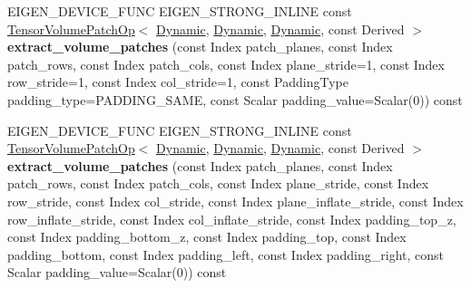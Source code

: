 \begin{DoxyCompactItemize}
\item 
\mbox{\label{class_eigen_1_1_tensor_base_3_01_derived_00_01_read_only_accessors_01_4_aceda047f96044dce3dcc7fb53b0337bc}} 
E\+I\+G\+E\+N\+\_\+\+D\+E\+V\+I\+C\+E\+\_\+\+F\+U\+NC E\+I\+G\+E\+N\+\_\+\+S\+T\+R\+O\+N\+G\+\_\+\+I\+N\+L\+I\+NE const \hyperlink{class_eigen_1_1_tensor_volume_patch_op}{Tensor\+Volume\+Patch\+Op}$<$ \hyperlink{namespace_eigen_ad81fa7195215a0ce30017dfac309f0b2}{Dynamic}, \hyperlink{namespace_eigen_ad81fa7195215a0ce30017dfac309f0b2}{Dynamic}, \hyperlink{namespace_eigen_ad81fa7195215a0ce30017dfac309f0b2}{Dynamic}, const Derived $>$ {\bfseries extract\+\_\+volume\+\_\+patches} (const Index patch\+\_\+planes, const Index patch\+\_\+rows, const Index patch\+\_\+cols, const Index plane\+\_\+stride=1, const Index row\+\_\+stride=1, const Index col\+\_\+stride=1, const Padding\+Type padding\+\_\+type=P\+A\+D\+D\+I\+N\+G\+\_\+\+S\+A\+ME, const Scalar padding\+\_\+value=Scalar(0)) const
\item 
\mbox{\label{class_eigen_1_1_tensor_base_3_01_derived_00_01_read_only_accessors_01_4_ae469b6926bcfc01f46f57f83ce1da1f7}} 
E\+I\+G\+E\+N\+\_\+\+D\+E\+V\+I\+C\+E\+\_\+\+F\+U\+NC E\+I\+G\+E\+N\+\_\+\+S\+T\+R\+O\+N\+G\+\_\+\+I\+N\+L\+I\+NE const \hyperlink{class_eigen_1_1_tensor_volume_patch_op}{Tensor\+Volume\+Patch\+Op}$<$ \hyperlink{namespace_eigen_ad81fa7195215a0ce30017dfac309f0b2}{Dynamic}, \hyperlink{namespace_eigen_ad81fa7195215a0ce30017dfac309f0b2}{Dynamic}, \hyperlink{namespace_eigen_ad81fa7195215a0ce30017dfac309f0b2}{Dynamic}, const Derived $>$ {\bfseries extract\+\_\+volume\+\_\+patches} (const Index patch\+\_\+planes, const Index patch\+\_\+rows, const Index patch\+\_\+cols, const Index plane\+\_\+stride, const Index row\+\_\+stride, const Index col\+\_\+stride, const Index plane\+\_\+inflate\+\_\+stride, const Index row\+\_\+inflate\+\_\+stride, const Index col\+\_\+inflate\+\_\+stride, const Index padding\+\_\+top\+\_\+z, const Index padding\+\_\+bottom\+\_\+z, const Index padding\+\_\+top, const Index padding\+\_\+bottom, const Index padding\+\_\+left, const Index padding\+\_\+right, const Scalar padding\+\_\+value=Scalar(0)) const
\item 
\mbox{\label{class_eigen_1_1_tensor_base_3_01_derived_00_01_read_only_accessors_01_4_a13033f46255c925ce8b0abe246a24f20}} 

\end{DoxyCompactItemize}
